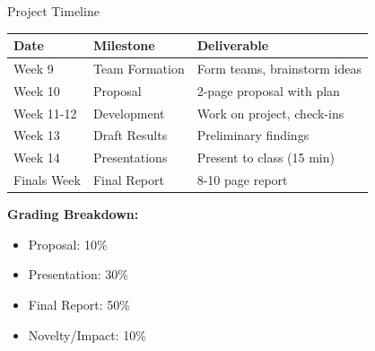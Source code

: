 \documentclass[aspectratio=169]{beamer}
\begin{document}
\begin{frame}{Project Timeline 📅}
\begin{table}
\small
\begin{tabular}{l l l}
\toprule
\textbf{Date} & \textbf{Milestone} & \textbf{Deliverable} \\
\midrule
Week 9 & Team Formation & Form teams, brainstorm ideas \\
Week 10 & Proposal & 2-page proposal with plan \\
Week 11-12 & Development & Work on project, check-ins \\
Week 13 & Draft Results & Preliminary findings \\
Week 14 & Presentations & Present to class (15 min) \\
Finals Week & Final Report & 8-10 page report \\
\bottomrule
\end{tabular}
\end{table}

\vspace{0.5em}

\textbf{Grading Breakdown:}
\begin{itemize}\setlength{\itemsep}{0pt}
    \item Proposal: 10\%
    \item Presentation: 30\%
    \item Final Report: 50\%
    \item Novelty/Impact: 10\%
\end{itemize}
\end{frame}
\end{document}

